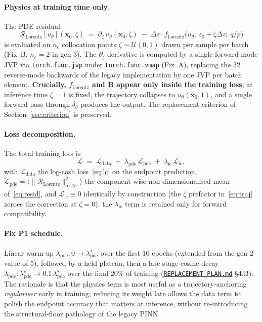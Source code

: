 \documentclass[11pt,a4paper]{article}
\newcommand{\qop}{q/p}
\newcommand{\dz}{\Delta z}
\newcommand{\Bfield}{\mathbf{B}}
\newcommand{\loss}{\mathcal{L}}
\begin{document}
\paragraph{Physics at training time only.} The PDE residual
\begin{equation}\label{eq:resid}
\mathcal{R}_\mathrm{Lorentz}[u_\theta](\mathbf{x}_0, \zeta)
\;=\;
\partial_\zeta\, u_\theta(\mathbf{x}_0, \zeta)
\;-\;
\dz \cdot f_\mathrm{Lorentz}\!\big(u_\theta, \, z_0 + \zeta\dz;\ \qop\big)
\end{equation}
is evaluated on $n_c$ collocation points
$\zeta \sim \mathcal{U}(0, 1)$ drawn per sample per batch (Fix~B,
$n_c = 2$ in gen-3). The $\partial_\zeta$ derivative is computed by a
single forward-mode JVP via \texttt{torch.func.jvp} under
\texttt{torch.func.vmap} (Fix~A), replacing the 32 reverse-mode backwards
of the legacy implementation by one JVP per batch element.
\textbf{Crucially, $f_\mathrm{Lorentz}$ and $\Bfield$ appear only inside
the training loss}; at inference time $\zeta = 1$ is fixed, the trajectory
collapses to $u_\theta(\mathbf{x}_0, 1)$, and a single forward pass through
$\delta_\theta$ produces the output. The replacement criterion of
Section~\ref{sec:criterion} is preserved.

\paragraph{Loss decomposition.} The total training loss is
\begin{equation}\label{eq:lossdecomp}
\loss \;=\;
\loss_\mathrm{data}
\;+\;
\lambda_\mathrm{pde}\, \loss_\mathrm{pde}
\;+\;
\lambda_\mathrm{ic}\, \loss_\mathrm{ic},
\end{equation}
with $\loss_\mathrm{data}$ the log-cosh loss~\eqref{eq:lc} on the endpoint
prediction, $\loss_\mathrm{pde} = \langle \|\mathcal{R}_\mathrm{Lorentz}\|^2_{\sigma/\dz}\rangle$
the component-wise non-dimensionalised mean of~\eqref{eq:resid}, and
$\loss_\mathrm{ic} \equiv 0$ identically by construction (the $\zeta$
prefactor in~\eqref{eq:traj} zeroes the correction at $\zeta = 0$); the
$\lambda_\mathrm{ic}$ term is retained only for forward compatibility.

\paragraph{Fix P1 schedule.} Linear warm-up
$\lambda_\mathrm{pde}: 0 \to \lambda_\mathrm{pde}^\star$ over the first 10
epochs (extended from the gen-2 value of 5), followed by a held plateau,
then a late-stage cosine decay
$\lambda_\mathrm{pde}: \lambda_\mathrm{pde}^\star \to 0.1\,\lambda_\mathrm{pde}^\star$
over the final 20\% of training
(\href{run:../../experiments/gen_3/REPLACEMENT_PLAN.md}{\texttt{REPLACEMENT\_PLAN.md}}
§4.B). The rationale is that the physics term is most useful as a
trajectory-anchoring \emph{regulariser} early in training; reducing its
weight late allows the data term to polish the endpoint accuracy that
matters at inference, without re-introducing the structural-floor pathology
of the legacy PINN.
\end{document}
